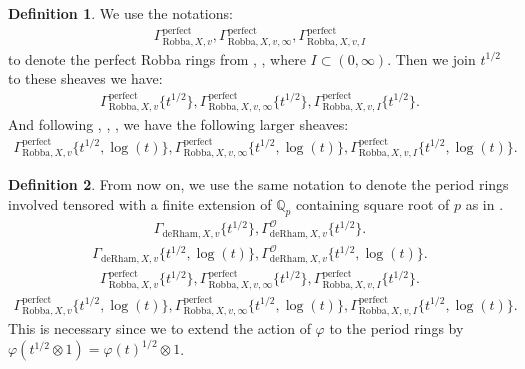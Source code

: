 \documentclass[12pt]{book}
\theoremstyle{definition}
\newtheorem{definition}{Definition}
\begin{document}
\begin{definition}
We use the notations:
\begin{align}
\Gamma^\mathrm{perfect}_{\text{Robba},X,v},\Gamma^\mathrm{perfect}_{\text{Robba},X,v,\infty},\Gamma^\mathrm{perfect}_{\text{Robba},X,v,I}
\end{align}
to denote the perfect Robba rings from \cite{KL1}, \cite{KL2}, where $I\subset (0,\infty)$. Then we join $t^{1/2}$ to these sheaves we have:
\begin{align}
\Gamma^\mathrm{perfect}_{\text{Robba},X,v}\{t^{1/2}\},\Gamma^\mathrm{perfect}_{\text{Robba},X,v,\infty}\{t^{1/2}\},\Gamma^\mathrm{perfect}_{\text{Robba},X,v,I}\{t^{1/2}\}.
\end{align}
And following \cite{BL1}, \cite{BL2}, \cite{Fon1}, \cite{BHS} we have the following larger sheaves:
\begin{align}
\Gamma^\mathrm{perfect}_{\text{Robba},X,v}\{t^{1/2},\log(t)\},\Gamma^\mathrm{perfect}_{\text{Robba},X,v,\infty}\{t^{1/2},\log(t)\},\Gamma^\mathrm{perfect}_{\text{Robba},X,v,I}\{t^{1/2},\log(t)\}.
\end{align} 
\end{definition}



\begin{definition}
From now on, we use the same notation to denote the period rings involved tensored with a finite extension of $\mathbb{Q}_p$ containing square root of $p$ as in \cite{BS}.
\begin{align}
\Gamma_{\text{deRham},X,v}\{t^{1/2}\},\Gamma^\mathcal{O}_{\text{deRham},X,v}\{t^{1/2}\}.
\end{align}
\begin{align}
\Gamma_{\text{deRham},X,v}\{t^{1/2},\log(t)\},\Gamma^\mathcal{O}_{\text{deRham},X,v}\{t^{1/2},\log(t)\}.
\end{align}
\begin{align}
\Gamma^\mathrm{perfect}_{\text{Robba},X,v}\{t^{1/2}\},\Gamma^\mathrm{perfect}_{\text{Robba},X,v,\infty}\{t^{1/2}\},\Gamma^\mathrm{perfect}_{\text{Robba},X,v,I}\{t^{1/2}\}.
\end{align}
\begin{align}
\Gamma^\mathrm{perfect}_{\text{Robba},X,v}\{t^{1/2},\log(t)\},\Gamma^\mathrm{perfect}_{\text{Robba},X,v,\infty}\{t^{1/2},\log(t)\},\Gamma^\mathrm{perfect}_{\text{Robba},X,v,I}\{t^{1/2},\log(t)\}.
\end{align}
This is necessary since we to extend the action of $\varphi$ to the period rings by $\varphi(t^{1/2}\otimes 1)=\varphi(t)^{1/2}\otimes 1$.
\end{definition}
\end{document}
